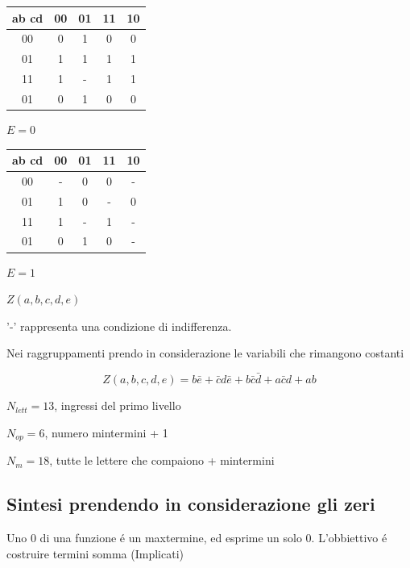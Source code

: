 \documentclass{article}
\begin{document}
\begin{minipage}{0.4\textwidth}
    \begin{center}
        \begin{tabular}{c|c|c|c|c|}
            ab cd & 00 & 01 & 11 & 10\\
            \hline
            00 &  0 & 1 & 0 & 0\\
            \hline
            01 & 1 & 1 & 1 & 1\\
            \hline
            11 & 1 & - & 1 & 1\\
            \hline
            01 & 0 & 1 & 0 & 0\\
            \hline
        \end{tabular}

        $E =0$
    \end{center}
\end{minipage}
\begin{minipage}{0.4\textwidth}
    \begin{center}
        \begin{tabular}{c|c|c|c|c|}
            ab cd & 00 & 01 & 11 & 10\\
            \hline
            00 &  - & 0 & 0 & -\\
            \hline
            01 & 1 & 0 & - & 0\\
            \hline
            11 & 1 & - & 1 & -\\
            \hline
            01 & 0 & 1 & 0 & -\\
            \hline
        \end{tabular}

        $E = 1$
    \end{center}
\end{minipage}
$Z(a, b, c, d ,e) $

'-' rappresenta una condizione di indifferenza.

Nei raggruppamenti prendo in considerazione le variabili che rimangono costanti

\[
    Z(a, b, c, d ,e) = b\bar{e} + \bar{c}d\bar{e} + b \bar{c}\bar{d} + a \bar{c}d + ab
\]


$N_{lett} = 13$, ingressi del primo livello

$N_{op} = 6$, numero mintermini + 1

$N_m = 18$, tutte le lettere che compaiono + mintermini

\subsection{Sintesi prendendo in considerazione gli zeri}
Uno 0 di una funzione \'e un maxtermine, ed esprime un solo 0. L'obbiettivo \'e costruire termini somma (Implicati)
\end{document}
